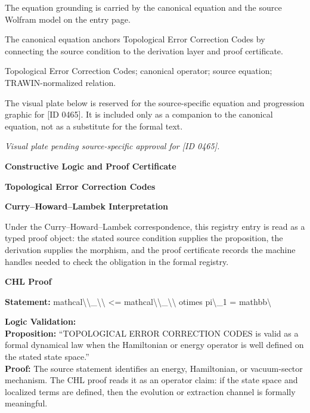 The equation grounding is carried by the canonical equation and the source Wolfram model on the entry page.

The canonical equation anchors Topological Error Correction Codes by connecting the source condition to the derivation layer and proof certificate.

Topological Error Correction Codes; canonical operator; source equation; TRAWIN-normalized relation.
\endgroup

\begingroup\footnotesize\sloppy
The visual plate below is reserved for the source-specific equation and progression graphic for [ID 0465]. It is included only as a companion to the canonical equation, not as a substitute for the formal text.
\par\endgroup
\begingroup\footnotesize\itshape
Visual plate pending source-specific approval for [ID 0465].
\par\endgroup

\clearpage
\begingroup\tzpsupportsetup
\noindent\textbf{\fontsize{10.8pt}{12.8pt}\selectfont [ID 0465] Constructive Logic and Proof Certificate}\par
\noindent\textbf{\fontsize{10pt}{12pt}\selectfont Topological Error Correction Codes}\par
\vspace{0.45em}
\begingroup
\footnotesize
\setlength{\parskip}{0.22em}
\setlength{\parindent}{0pt}
\noindent\textbf{Curry--Howard--Lambek Interpretation}\par
Under the Curry--Howard--Lambek correspondence, this registry entry is read as a typed proof
object: the stated source condition supplies the proposition, the derivation supplies the
morphism, and the proof certificate records the machine handles needed to check the obligation
in the formal registry.

\vspace{0.45em}
\noindent\textbf{CHL Proof}\par
\textbf{Statement:} mathcal\textbackslash{}\textbackslash{}\_\textbackslash{}\textbackslash{} <= mathcal\textbackslash{}\textbackslash{}\_\textbackslash{}\textbackslash{} otimes pi\textbackslash{}\_1 = mathbb\textbackslash{}

\textbf{Logic Validation:}\\
\textbf{Proposition:} ``TOPOLOGICAL ERROR CORRECTION CODES is valid as a formal dynamical law when the
Hamiltonian or energy operator is well defined on the stated state space.''\\
\textbf{Proof:} The source statement identifies an energy, Hamiltonian, or vacuum-sector mechanism. The
CHL proof reads it as an operator claim: if the state space and localized terms are
defined, then the evolution or extraction channel is formally meaningful.

